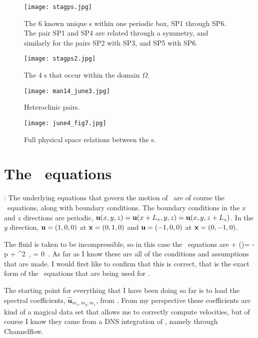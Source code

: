 \begin{figure}[!h]
\texttt{[image: stagps.jpg]}
  \caption{
   The 6 known unique \stagp s within one periodic box, SP1 through
   SP6. The pair SP1 and SP4 are related through a symmetry, and
   similarly for the pairs SP2 with SP3, and SP5 with SP6.
   }
  \label{eltonFig:stagps_label}
 \end{figure}

 \begin{figure}[!h]
\texttt{[image: stagps2.jpg]}
  \caption{
   The 4 \stagp s that occur within the domain $\Omega$.
   }
  \label{eltonFig:stagps_label2}
 \end{figure}

 \begin{figure}[!h]
\texttt{[image: man14\_june3.jpg]}
  \caption{
   Heteroclinic pairs.
   }
  \label{eltonFig:hetero1}
 \end{figure}

 \begin{figure}[!h]
\texttt{[image: june4\_fig7.jpg]}
  \caption{
   Full physical space relations between the \stagp s.
   }
  \label{eltonFig:hetero2}
 \end{figure}

\section{The \NS\ equations}
 \label{sect:NavierStokes}
 : The underlying equations
that govern the motion of \pCf\ are of course the \NS\ equations,
along with boundary conditions. The boundary conditions in the $x$
and $z$ directions are periodic,
 $ {\bf u}(x, y, z) = {\bf u}(x+L_x, y, z) =
{\bf u}(x, y, z + L_z) $.
 In the $y$ direction,
 ${\bf u} = (1,0,0)$ at ${\bf x} = (0,1,0)$ and ${\bf u} = (-1,0,0)$ at ${\bf x} =
 (0,-1,0)$.

 The fluid is taken to be incompressible, so in this case the
 \NS\ equations are
 \beq
  + (\bu \cdot \nabla)\bu = -\nabla p + \nu \nabla^{2} \bu
    \,,\qquad
\nabla \cdot \bu  = 0 \,. \label{eqn:NavierStokes} \eeq As far as I
know these are all of the conditions and assumptions that are made.
I would first like to confirm that this is correct, that
 is the exact form of the \NS\ equations
that are being used for \pCf.

The starting point for everything that I have been doing so far is
to load the spectral coefficients,
$\mathbf{\hat{u}}_{m_{x},m_{y},m_{z}}$, from
. From my perspective these coefficients are
kind of a magical data set that allows me to correctly compute
velocities, but of course I know they came from a DNS integration of
, namely through Channelflow.

